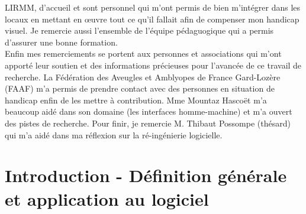 \documentclass[french,a4paper]{report}
\begin{document}
LIRMM,
d'accueil et sont personnel qui m'ont permis de bien m'intégrer dans les locaux en
mettant en œuvre tout ce qu'il fallait afin de compenser mon handicap visuel. Je remercie aussi
l'ensemble de l'équipe pédaguogique qui a permis d'assurer une bonne formation.\\
Enfin mes remerciements se portent aux personnes et associations qui m'ont apporté leur
soutien et des informations précieuses pour l'avancée de ce travail de recherche. La
Fédération des Aveugles et Amblyopes de France Gard-Lozère (FAAF) m'a permis
de prendre contact avec des personnes en situation de handicap enfin de les mettre à
contribution. Mme Mountaz Hascoët m'a beaucoup aidé dans son domaine (les interfaces
homme-machine) et m'a ouvert des pistes de recherche. Pour finir, je remercie M. Thibaut Possompe
(thésard) qui m'a aidé dans ma réflexion sur la ré-ingénierie logicielle.
\newpage\thispagestyle{empty}
\strut
\newpage
\setcounter{page}{1}
\newpage
\tableofcontents
\newpage
\listoffigures
\printglossaries
\glsaddall
\makeglossaries
{}
\pagestyle{fancy}
\renewcommand{\chaptermark}[1]{\markboth{#1}{}}
\renewcommand\headrulewidth{.8pt}
\renewcommand\footrulewidth{.5pt}
\fancyhead[L]{}
\fancyhead[R]{\leftmark}
\fancyfoot[C]{\thepage}
\fancyfoot[R]{\today}
\chapter{Introduction - Définition générale et application au logiciel}
\end{document}
